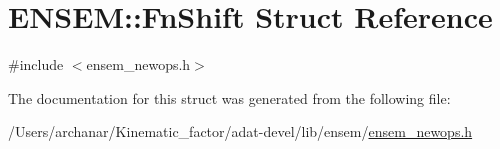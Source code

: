 \hypertarget{structENSEM_1_1FnShift}{}\section{E\+N\+S\+EM\+:\+:Fn\+Shift Struct Reference}
\label{structENSEM_1_1FnShift}


{\ttfamily \#include $<$ensem\+\_\+newops.\+h$>$}



The documentation for this struct was generated from the following file\+:\begin{DoxyCompactItemize}
\item 
/\+Users/archanar/\+Kinematic\+\_\+factor/adat-\/devel/lib/ensem/\mbox{\hyperlink{adat-devel_2lib_2ensem_2ensem__newops_8h}{ensem\+\_\+newops.\+h}}\end{DoxyCompactItemize}
